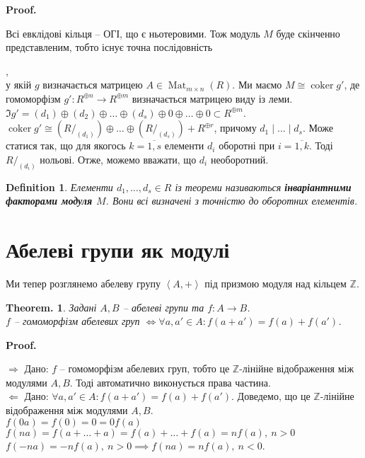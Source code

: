 \documentclass[a4paper, 10pt]{article}
\makeatletter
\def\rightproof{$\boxed{\Rightarrow}$ }
\def\leftproof{$\boxed{\Leftarrow}$ }
\theoremstyle{theoremdd}
\theoremstyle{theoremdd}
\newtheorem{definition}[theorem]{Definition}
\theoremstyle{theoremdd}
\theoremstyle{theoremdd}
\theoremstyle{theoremdd}
\theoremstyle{theoremdd}
\theoremstyle{theoremdd}
\theoremstyle{theoremdd}
\newtheorem*{theorem*}{Theorem.}
\theoremstyle{theoremdd}
\theoremstyle{theoremdd}
\theoremstyle{theoremdd}
\theoremstyle{theoremdd}
\theoremstyle{theoremdd}
\theoremstyle{theoremdd}
\theoremstyle{theoremdd}
\renewenvironment{proof}[1][Proof.\\]{\par
\pushQED{\hfill \qed}%
\normalfont \topsep6\p@\@plus6\p@\relax
\trivlist
\item\relax
{\bfseries
#1\@addpunct{.}}\hspace\labelsep\ignorespaces
}{%
\popQED\endtrivlist\@endpefalse
}
\DeclareMathOperator{\Mat}{Mat}
\DeclareMathOperator{\coker}{coker}
\makeatother
\begin{document}
\begin{proof}
Всі евклідові кільця -- ОГІ, що є ньотеровими. Тож модуль $M$ буде скінченно представленим, тобто існує точна послідовність\\ ,\\
у якій $g$ визначається матрицею $A \in \Mat_{m \times n}(R)$. Ми маємо $M \cong \coker g'$, де гомоморфізм $g' \colon R^{\oplus n} \to R^{\oplus m}$ визначається матрицею виду із леми.\\
$\Im g' = (d_1) \oplus (d_2) \oplus \dots \oplus (d_s) \oplus 0 \oplus \dots \oplus 0 \subset R^{\oplus m}$.\\
$\coker g' \cong (R/_{(d_1)}) \oplus \dots \oplus (R/_{(d_s)}) + R^{\oplus r}$, причому $d_1 \mid \dots \mid d_s$. Може статися так, що для якогось $k = \overline{1,s}$ елементи $d_i$ оборотні при $i = \overline{1,k}$. Тоді $R/_{(d_i)}$ нольові. Отже, можемо вважати, що $d_i$ необоротний.
\end{proof}

\begin{definition}
Елементи $d_1,\dots,d_s \in R$ із теореми називаються \textbf{інваріантними факторами модуля $M$}. Вони всі визначені з точністю до оборотних елементів.
\end{definition}

\newpage
\section*{Абелеві групи як модулі}
Ми тепер розглянемо абелеву групу $\left< A, +\right>$ під призмою модуля над кільцем $\mathbb{Z}$.

\begin{theorem*}
Задані $A,B$ -- абелеві групи та $f \colon A \to B$.\\
$f$ -- гомоморфізм абелевих груп $\iff \forall a,a' \in A: f(a+a') = f(a) + f(a')$.
\end{theorem*}

\begin{proof}
\rightproof Дано: $f$ -- гомоморфізм абелевих груп, тобто це $\mathbb{Z}$-лінійне відображення між модулями $A,B$. Тоді автоматично виконується права частина.
\bigskip \\
\leftproof Дано: $\forall a,a' \in A: f(a+a') = f(a) + f(a')$. Доведемо, що це $\mathbb{Z}$-лінійне відображення між модулями $A,B$.\\
$f(0a) = f(0) = 0 = 0f(a)$\\
$f(na) = f(a+\dots + a) = f(a) + \dots + f(a) = n f(a),\ n > 0$\\
$f(-n a) = -n f(a),\ n > 0 \implies f(na) = nf(a),\ n < 0$.
\end{proof}
\end{document}
